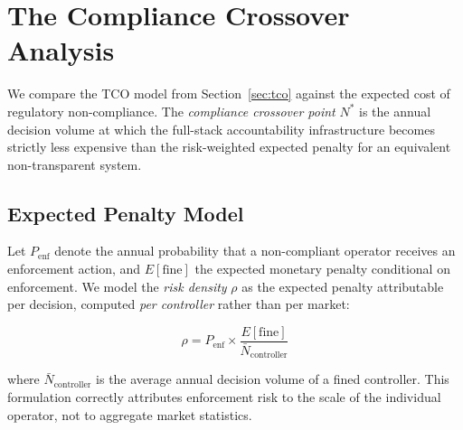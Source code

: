 %

\section{The Compliance Crossover Analysis}
\label{sec:crossover}

We compare the TCO model from Section~\ref{sec:tco} against the
expected cost of regulatory non-compliance. The \emph{compliance
crossover point} $N^*$ is the annual decision volume at which the
full-stack accountability infrastructure becomes strictly less expensive
than the risk-weighted expected penalty for an equivalent non-transparent
system.

\subsection{Expected Penalty Model}
\label{subsec:penalty-model}

Let $P_{\text{enf}}$ denote the annual probability that a non-compliant
operator receives an enforcement action, and $E[\text{fine}]$ the
expected monetary penalty conditional on enforcement. We model the
\emph{risk density} $\rho$ as the expected penalty attributable per
decision, computed \emph{per controller} rather than per market:

\[
  \rho = P_{\text{enf}} \times \frac{E[\text{fine}]}{\bar{N}_{\text{controller}}}
\]

\noindent where $\bar{N}_{\text{controller}}$ is the average annual
decision volume of a fined controller. This formulation correctly
attributes enforcement risk to the scale of the individual operator,
not to aggregate market statistics.

